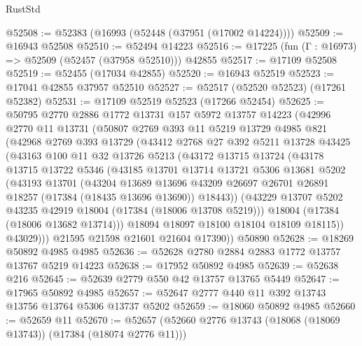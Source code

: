 \begin{lexlean}{RustStd}
\begin{coremodule}
@52508 := @52383 (@16993 (@52448 (@37951 (@17002 @14224))))
@52509 := @16943 @52508
@52510 := @52494 @14223
@52516 := @17225 (fun (Γ : @16973) => @52509 (@52457 (@37958 @52510))) @42855
@52517 := @17109 @52508
@52519 := @52455 (@17034 @42855)
@52520 := @16943 @52519
@52523 := @17041 @42855 @37957 @52510
@52527 := @52517 (@52520 @52523) (@17261 @52382)
@52531 := @17109 @52519 @52523 (@17266 @52454)
@52625 := @50795
    @2770
    @2886
    @1772
    @13731
    @157
    @5972
    @13757
    @14223
    (@42996
      @2770
      @11
      @13731
      (@50807
        @2769
        @393
        @11
        @5219
        @13729
        @4985
        @821
        (@42968
          @2769
          @393
          @13729
          (@43412
            @2768
            @27
            @392
            @5211
            @13728
            @43425
            (@43163
              @100
              @11
              @32
              @13726
              @5213
              (@43172
                @13715
                @13724
                (@43178
                  @13715
                  @13722
                  @5346
                  (@43185
                    @13701
                    @13714
                    @13721
                    @5306
                    @13681
                    @5202
                    (@43193
                      @13701
                      (@43204
                        @13689
                        @13696
                        @43209
                        @26697
                        @26701
                        @26891
                        @18257
                        (@17384 (@18435 @13696 @13690))
                        @18443))
                    (@43229 @13707 @5202 @43235 @42919 @18004 (@17384 (@18006 @13708 @5219)))
                    @18004
                    (@17384 (@18006 @13682 @13714)))
                  @18094
                  @18097
                  @18100
                  @18104
                  @18109
                  @18115))
              @43029)))
        @21595
        @21598
        @21601
        @21604
        @17390))
    @50890
@52628 := @18269 @50892 @4985 @4985
@52636 := @52628 @2780 @2884 @2883 @1772 @13757 @13767 @5219 @14223
@52638 := @17952 @50892 @4985
@52639 := @52638 @216
@52645 := @52639 @2779 @550 @42 @13757 @13765 @5449
@52647 := @17965 @50892 @4985
@52657 := @52647 @2777 @440 @11 @392 @13743 @13756 @13764 @5306 @13737 @5202
@52659 := @18060 @50892 @4985
@52660 := @52659 @11
@52670 := @52657 (@52660 @2776 @13743 (@18068 (@18069 @13743)) (@17384 (@18074 @2776 @11)))

\end{coremodule}
\end{lexlean}
